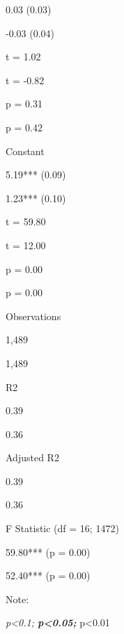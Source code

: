 \documentclass[
]{book}
\begin{document}
0.03 (0.03)

-0.03 (0.04)

t = 1.02

t = -0.82

p = 0.31

p = 0.42

Constant

5.19*** (0.09)

1.23*** (0.10)

t = 59.80

t = 12.00

p = 0.00

p = 0.00

Observations

1,489

1,489

R2

0.39

0.36

Adjusted R2

0.39

0.36

F Statistic (df = 16; 1472)

59.80*** (p = 0.00)

52.40*** (p = 0.00)

Note:

\emph{p\textless0.1; \textbf{p\textless0.05; }}p\textless0.01
\end{document}
